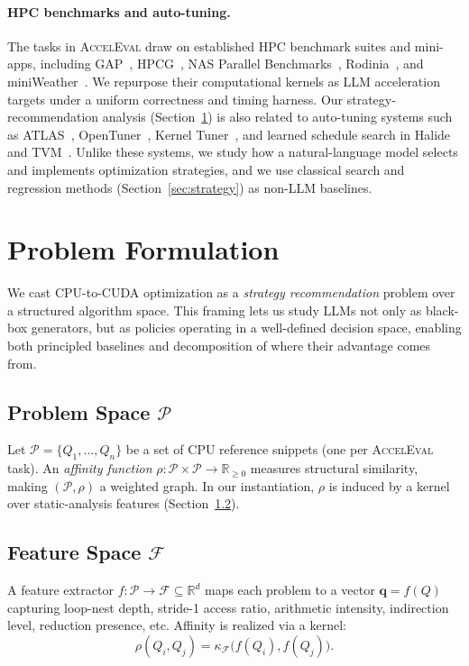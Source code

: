 \documentclass{article}
\begin{document}
\paragraph{HPC benchmarks and auto-tuning.}
The tasks in \textsc{AccelEval} draw on established HPC benchmark suites and mini-apps, including GAP~\citep{gapbs}, HPCG~\citep{hpcg}, NAS Parallel Benchmarks~\citep{npb}, Rodinia~\citep{rodinia}, and miniWeather~\citep{miniweather}. We repurpose their computational kernels as LLM acceleration targets under a uniform correctness and timing harness. Our strategy-recommendation analysis (Section~\ref{sec:formulation}) is also related to auto-tuning systems such as ATLAS~\citep{atlas}, OpenTuner~\citep{opentuner}, Kernel Tuner~\citep{kerneltuner}, and learned schedule search in Halide and TVM~\citep{halide-autoscheduler,tvm}. Unlike these systems, we study how a natural-language model selects and implements optimization strategies, and we use classical search and regression methods (Section~\ref{sec:strategy}) as non-LLM baselines.

\section{Problem Formulation}
\label{sec:formulation}

We cast CPU-to-CUDA optimization as a \emph{strategy recommendation}
problem over a structured algorithm space. This framing lets us study
LLMs not only as black-box generators, but as policies operating in a
well-defined decision space, enabling both principled baselines and
decomposition of where their advantage comes from.

\subsection{Problem Space $\mathcal{P}$}
Let $\mathcal{P} = \{Q_1, \ldots, Q_n\}$ be a set of CPU reference
snippets (one per \textsc{AccelEval} task). An \emph{affinity function}
$\rho : \mathcal{P} \times \mathcal{P} \to \mathbb{R}_{\geq 0}$
measures structural similarity, making $(\mathcal{P}, \rho)$ a weighted
graph. In our instantiation, $\rho$ is induced by a kernel over
static-analysis features (Section~\ref{sec:feature}).

\subsection{Feature Space $\mathcal{F}$}
\label{sec:feature}
A feature extractor $f : \mathcal{P} \to \mathcal{F} \subseteq
\mathbb{R}^d$ maps each problem to a vector
$\mathbf{q} = f(Q)$ capturing loop-nest depth, stride-1 access ratio,
arithmetic intensity, indirection level, reduction presence, etc.
Affinity is realized via a kernel:
\begin{equation}
\rho(Q_i, Q_j) = \kappa_\mathcal{F}\bigl(f(Q_i), f(Q_j)\bigr).
\label{eq:affinity}
\end{equation}
\end{document}
